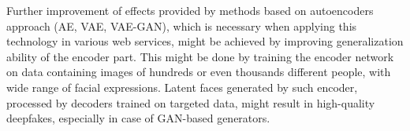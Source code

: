 Further improvement of effects provided by methods based on autoencoders approach (AE, VAE, VAE-GAN), which is necessary when applying this technology in various web services, might be achieved by improving generalization ability of the encoder part. This might be done by training the encoder network on data containing images of hundreds or even thousands different people, with wide range of facial expressions. Latent faces generated  by such encoder, processed by decoders trained on targeted data, might result in high-quality deepfakes, especially in case of GAN-based generators.